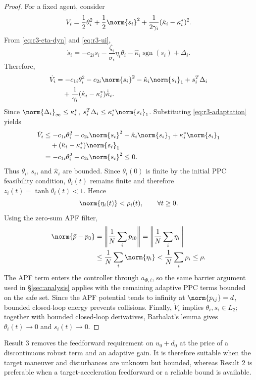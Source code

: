 \begin{proof}
For a fixed agent, consider
\[
V_i
=\frac12\theta_i^2+\frac12\norm{s_i}^2
 +\frac{1}{2\gamma_i}(\hat\kappa_i-\kappa_i^*)^2.
\]
From \eqref{eq:r3-eta-dyn} and \eqref{eq:r3-ui},
\[
\dot s_i
=-c_{2i}s_i-\frac{\zeta_i}{\sigma_i}\eta_i\theta_i
-\hat\kappa_i\operatorname{sgn}(s_i)+\Delta_i.
\]
Therefore,
\[
\begin{aligned}
\dot V_i
&=-c_{1i}\theta_i^2-c_{2i}\norm{s_i}^2
  -\hat\kappa_i\norm{s_i}_1+s_i^T\Delta_i\\
&\quad
  +\frac{1}{\gamma_i}(\hat\kappa_i-\kappa_i^*)\dot{\hat\kappa}_i .
\end{aligned}
\]
Since $\norm{\Delta_i}_\infty\le\kappa_i^*$,
$s_i^T\Delta_i\le\kappa_i^*\norm{s_i}_1$.  Substituting
\eqref{eq:r3-adaptation} yields
\[
\begin{aligned}
\dot V_i
&\le -c_{1i}\theta_i^2-c_{2i}\norm{s_i}^2
    -\hat\kappa_i\norm{s_i}_1+\kappa_i^*\norm{s_i}_1\\
&\quad
    +(\hat\kappa_i-\kappa_i^*)\norm{s_i}_1\\
&= -c_{1i}\theta_i^2-c_{2i}\norm{s_i}^2\le0 .
\end{aligned}
\]
Thus $\theta_i$, $s_i$, and $\hat\kappa_i$ are bounded.  Since
$\theta_i(0)$ is finite by the initial PPC feasibility condition,
$\theta_i(t)$ remains finite and therefore
$z_i(t)=\tanh\theta_i(t)<1$.  Hence
\[
\norm{\eta_i(t)}<\rho_i(t),\qquad \forall t\ge0.
\]
Using the zero-sum APF filter,
\[
\begin{aligned}
\norm{\bar p-p_0}
&=\left\|\frac1N\sum_i p_{i0}\right\|
 =\left\|\frac1N\sum_i \eta_i\right\|\\
&\le \frac1N\sum_i\norm{\eta_i}
 < \frac1N\sum_i\rho_i
\le \rho .
\end{aligned}
\]
The APF term enters the controller through $a_{\Phi,i}$, so the same
barrier argument used in \S\ref{sec:analysis} applies with the remaining
adaptive PPC terms bounded on the safe set.  Since the APF potential tends
to infinity at $\norm{p_{ij}}=d$, bounded closed-loop energy prevents
collisions.  Finally, $\dot V_i$ implies $\theta_i,s_i\in L_2$; together
with bounded closed-loop derivatives, Barbalat's lemma gives
$\theta_i(t)\to0$ and $s_i(t)\to0$.
\end{proof}

\begin{remark}
Result 3 removes the feedforward requirement on $u_0+d_0$ at the price of a
discontinuous robust term and an adaptive gain.  It is therefore suitable
when the target maneuver and disturbances are unknown but bounded, whereas
Result 2 is preferable when a target-acceleration feedforward or a reliable
bound is available.
\end{remark}
